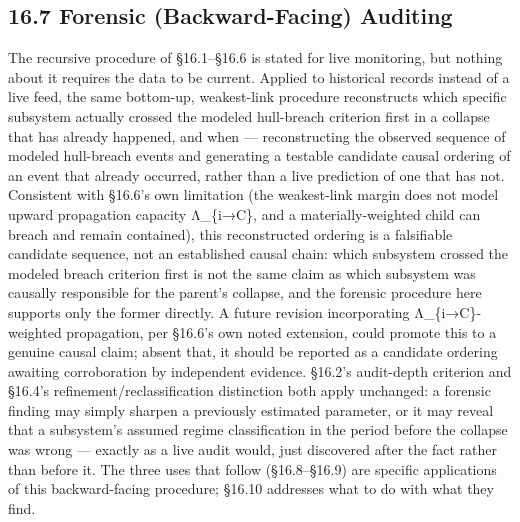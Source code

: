 \documentclass[
]{article}
\begin{document}
\hypertarget{forensic-backward-facing-auditing}{%
\subsection{16.7 Forensic (Backward-Facing)
Auditing}\label{forensic-backward-facing-auditing}}

The recursive procedure of §16.1--§16.6 is stated for live monitoring,
but nothing about it requires the data to be current. Applied to
historical records instead of a live feed, the same bottom-up,
weakest-link procedure reconstructs which specific subsystem actually
crossed the modeled hull-breach criterion first in a collapse that has
already happened, and when --- reconstructing the observed sequence of
modeled hull-breach events and generating a testable candidate causal
ordering of an event that already occurred, rather than a live
prediction of one that has not. Consistent with §16.6's own limitation
(the weakest-link margin does not model upward propagation capacity
Λ\_\{i→C\}, and a materially-weighted child can breach and remain
contained), this reconstructed ordering is a falsifiable candidate
sequence, not an established causal chain: which subsystem crossed the
modeled breach criterion first is not the same claim as which subsystem
was causally responsible for the parent's collapse, and the forensic
procedure here supports only the former directly. A future revision
incorporating Λ\_\{i→C\}-weighted propagation, per §16.6's own noted
extension, could promote this to a genuine causal claim; absent that, it
should be reported as a candidate ordering awaiting corroboration by
independent evidence. §16.2's audit-depth criterion and §16.4's
refinement/reclassification distinction both apply unchanged: a forensic
finding may simply sharpen a previously estimated parameter, or it may
reveal that a subsystem's assumed regime classification in the period
before the collapse was wrong --- exactly as a live audit would, just
discovered after the fact rather than before it. The three uses that
follow (§16.8--§16.9) are specific applications of this backward-facing
procedure; §16.10 addresses what to do with what they find.
\end{document}
